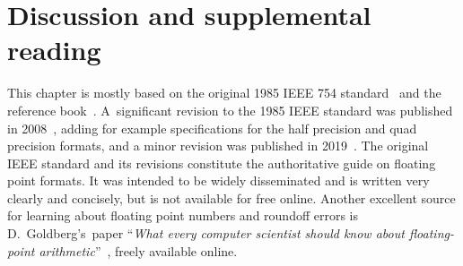 









\section{Discussion and supplemental reading}%
\label{sec:discussion_and_bibliograhpy}
This chapter is mostly based on the original 1985 IEEE 754 standard~\cite{ieee754} and the reference book~\cite{MR2265914}.
A~significant revision to the 1985 IEEE standard was published in 2008~\cite{ieee2008},
adding for example specifications for the half precision and quad precision formats,
and a minor revision was published in 2019~\cite{ieee2019}.
The original IEEE standard and its revisions constitute the authoritative guide on floating point formats.
It was intended to be widely disseminated and is written very clearly and concisely,
but is not available for free online.
Another excellent source for learning about floating point numbers and roundoff errors is D.\ Goldberg's~paper ``\emph{What every computer scientist should know about floating-point arithmetic}''~\cite{goldberg1991every},
freely available online.

